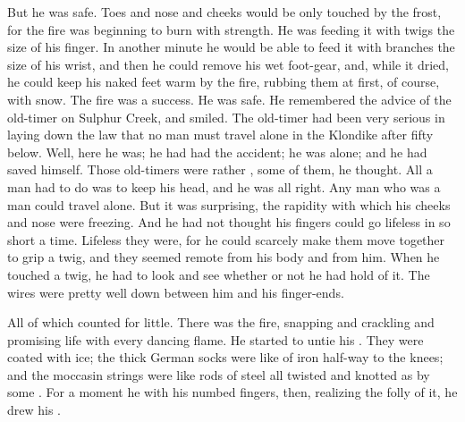 \documentclass{fiche}
\begin{document}
\begin{texte}
But he was safe. Toes and nose and cheeks would be only touched by the frost, for the fire
was beginning to burn with strength. He was feeding it with twigs the size of his finger. In
another minute he would be able to feed it with branches the size of his wrist, and then he
could remove his wet foot-gear, and, while it dried, he could keep his naked feet warm by the
fire, rubbing them at first, of course, with snow. The fire was a success. He was safe. He
remembered the advice of the old-timer on Sulphur Creek, and smiled. The old-timer had been
very serious in laying down the law that no man must travel alone in the Klondike after fifty
below. Well, here he was; he had had the accident; he was alone; and he had saved himself.
Those old-timers were rather , some of them, he thought. All a man had to do was to
keep his head, and he was all right. Any man who was a man could travel alone. But it was
surprising, the rapidity with which his cheeks and nose were freezing. And he had not thought
his fingers could go lifeless in so short a time. Lifeless they were, for he could scarcely
make them move together to grip a twig, and they seemed remote from his body and from him.
When he touched a twig, he had to look and see whether or not he had hold of it. The wires
were pretty well down between him and his finger-ends.

All of which counted for little. There was the fire, snapping and crackling and promising life
with every dancing flame. He started to untie his .
They were coated with ice; the thick German socks were like  of iron half-way to the knees; and the moccasin strings were like rods of steel
all twisted and knotted as by some . For a
moment he  with his numbed fingers, then, realizing
the folly of it, he drew his .
\end{texte}

\end{document}
